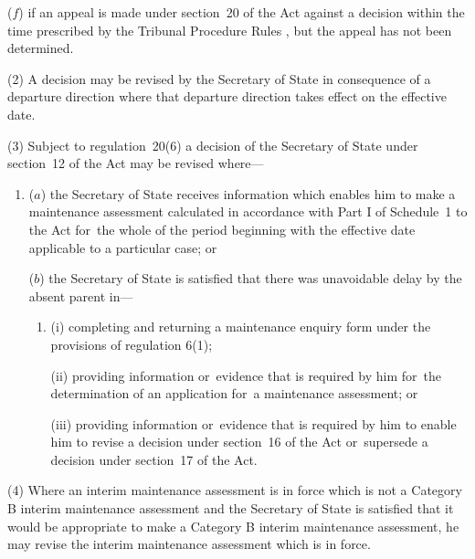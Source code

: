 \documentclass[a4paper,12pt]{article}
\begin{document}
\begin{enumerate}
    ($f$) 
    if an appeal is made under section~20 of the Act against a decision within the time prescribed 
by the Tribunal Procedure Rules%
, but the appeal has not been determined.
\end{enumerate}

(2) A decision may be revised by the Secretary of State in consequence of a departure direction where that departure direction takes effect on the effective date.

(3) Subject to regulation~20(6) a decision of the Secretary of State under section~12 of the Act may be revised where---
\begin{enumerate}\item[]
($a$) the Secretary of State receives information which enables him to make a maintenance assessment calculated in accordance with Part I of Schedule~1 to the Act for~the whole of the period beginning with the effective date applicable to a particular case; or

($b$) the Secretary of State is satisfied that there was unavoidable delay by the absent parent in---
\begin{enumerate}\item[]
(i) completing and returning a maintenance enquiry form under the provisions of regulation 6(1);

(ii) providing information or~evidence that is required by him for~the determination of an application for~a maintenance assessment; or

(iii) providing information or~evidence that is required by him to enable him to revise a decision under section~16 of the Act or~supersede a decision under section~17 of the Act.
\end{enumerate}
\end{enumerate}

(4) Where an interim maintenance assessment is in force which is not a Category B interim maintenance assessment and the Secretary of State is satisfied that it would be appropriate to make a Category B interim maintenance assessment, he may revise the interim maintenance assessment which is in force.
\end{document}

